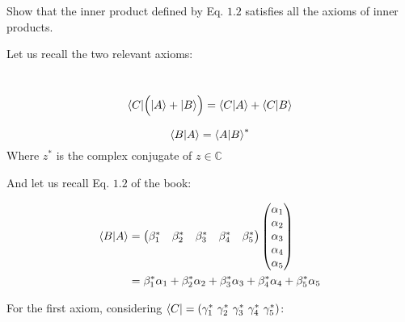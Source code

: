 \documentclass[solutions.tex]{subfiles}
\begin{document}
\maketitle
\begin{exercise}
Show that the inner product defined by Eq. $1.2$ satisfies all the
axioms of inner products.
\end{exercise}
\hrr
Let us recall the two relevant axioms:
\begin{axiom}\ \\
$$ \langle C| \Big( |A\rangle + |B\rangle \Big) = \left\langle C \middle| A \right\rangle + \left\langle C \middle| B \right\rangle $$
\end{axiom}
\begin{axiom}
$$ \left\langle B \middle| A \right\rangle = \left\langle A \middle| B \right\rangle^{*} $$
Where $z^{*}$ is the complex conjugate of $z\in\mathbb{C}$
\end{axiom}

And let us recall Eq. $1.2$ of the book:

\begin{align*}
	\left\langle B \middle| A \right\rangle &=
		\begin{pmatrix}
			\beta_1^* & \beta_2^* & \beta_3^* & \beta_4^* & \beta_5^* \\
		\end{pmatrix}
		\begin{pmatrix}
			\alpha_1 \\
			\alpha_2 \\
			\alpha_3 \\
			\alpha_4 \\
			\alpha_5 \\
		\end{pmatrix} \\
	~ &= \beta_1^*\alpha_1 + \beta_2^*\alpha_2 + \beta_3^*\alpha_3 +
	\beta_4^*\alpha_4 + \beta_5^*\alpha_5 \\
\end{align*}

For the first axiom, considering $\bra{C} =
(\gamma_1^*\ \gamma_2^*\ \gamma_3^*\ \gamma_4^*\ \gamma_5^*)$:
\end{document}
